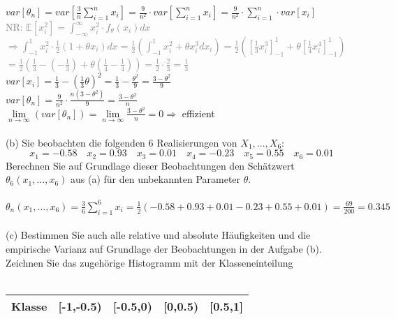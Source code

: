 \documentclass[a4paper]{article}
\begin{document}
\(var[\theta_n]=var\left[\frac{3}{n} \sum\limits^n_{i=1}x_i\right]=\frac{9}{n^2}\cdot var\left[\sum\limits^n_{i=1}x_i\right]=\frac{9}{n^2}\cdot \sum\limits^n_{i=1}\cdot var\left[x_i\right]\)\\
\textcolor{gray}{NR: $\mathbb{E}[x_i^2]=\int^\infty_{-\infty}x_i^2\cdot f_\theta(x_i)dx$}\\
\hspace*{1.6cm}\textcolor{gray}{$\Rightarrow \int^1_{-1}x_i^2 \cdot \frac{1}{2}(1+\theta x_i)dx=\frac{1}{2}\left(\int^1_{-1}x_i^2+\theta x_i^3 dx_i\right)=\frac{1}{2}\left(\left[\frac{1}{3}x_i^3\right]^1_{-1}+\theta\left[\frac{1}{4}x_i^4\right]^1_{-1}\right)$}\\
\hspace*{1.65cm}\textcolor{gray}{$=\frac{1}{2}\left(\frac{1}{3}-\left(-\frac{1}{3}\right)+\theta\left(\frac{1}{4}-\frac{1}{4}\right)\right)=\frac{1}{2}\cdot \frac{2}{3}=\frac{1}{3}$}\\
\(var[x_i]=\frac{1}{3}-\left(\frac{1}{3}\theta\right)^2=\frac{1}{3}-\frac{\theta^2}{9}=\frac{3-\theta^2}{9}\)\\
\(var[\theta_n]=\frac{9}{n^2}\cdot \frac{n(3-\theta^2)}{9}=\frac{3-\theta^2}{n}\)\\
\(\lim\limits_{n\to\infty}(var[\theta_n])=\lim\limits_{n\to\infty}\frac{3-\theta^2}{n}=0 \Rightarrow\) effizient\\\\
(b) Sie beobachten die folgenden 6 Realisierungen von $X_1,\dots, X_6$:\\
\[x_1 = -0.58\quad x_2 = 0.93\quad x_3 = 0.01\quad x_4 = -0.23\quad x_5 = 0.55 \quad x_6 = 0.01\]
Berechnen Sie auf Grundlage dieser Beobachtungen den Schätzwert $\theta_6(x_1,\dots ,x_6)$ aus (a) für den unbekannten Parameter $\theta$.\\\\
\(\theta_n(x_1,\dots,x_6)=\frac{3}{6}\sum\limits^6_{i=1}x_i=\frac{1}{2}(-0.58+0.93+0.01-0.23+0.55+0.01)=\frac{69}{200}=0.345\)\\\\
(c) Bestimmen Sie auch alle relative und absolute Häufigkeiten und die empirische Varianz auf Grundlage der Beobachtungen in der Aufgabe (b). Zeichnen Sie das zugehörige Histogramm mit der Klasseneinteilung\\\\
\begin{tabular}{|c|c|c|c|c|}
    \hline
     Klasse & [-1,-0.5) & [-0.5,0) & [0,0.5) & [0.5,1]\\
     \hline
\end{tabular}\\\\
\end{document}
